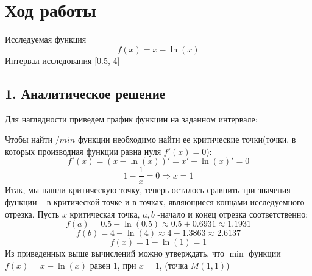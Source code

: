 \documentclass[a4paper, 42pt]{article}
\begin{document}
	\section*{Ход работы}
	Исследуемая функция \[f(x) = x -   \ln(x)\] Интервал исследования [0.5, 4]
	\subsection*{1. Аналитическое решение}
	Для наглядности приведем график функции на заданном интервале:


	Чтобы найти $/min$ функции необходимо найти ее критические точки(точки, в которых производная функции равна нуля $f'(x) = 0$):
	\[f'(x) = (x - \ln(x))' = x' - \ln(x)' = 0\]
	\[1 - \frac{1}{x} = 0 \Rightarrow x = 1\]
	Итак, мы нашли критическую точку, теперь осталось сравнить три значения функции -- в критической точке и в точках, являющиеся концами исследуемного отрезка. Пусть $x$ критическая точка, $a, b$ -начало и конец отрезка соответственно:
	\[f(a) = 0.5 - \ln(0.5) \approx 0.5 + 0.6931  \approx 1.1931\]
	\[f(b) = 4 - \ln(4) \approx 4 - 1.3863 \approx 2.6137\]
	\[f(x) = 1 - \ln(1) = 1\]
	Из приведенных выше вычислений можно утверждать, что $\min$ функции $f(x) = x - \ln(x)$ равен 1, при $x =1$, (точка $M(1,1)$)
\end{document}
